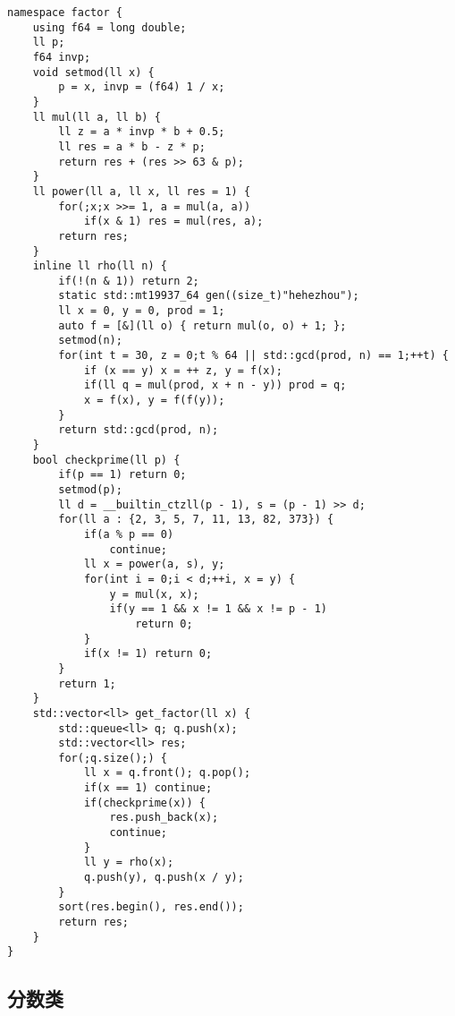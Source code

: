 \documentclass[a4paper,10pt]{article}
\begin{document}
\noindent\begin{lstlisting}
namespace factor {
    using f64 = long double;
    ll p;
    f64 invp;
    void setmod(ll x) {
        p = x, invp = (f64) 1 / x;
    }
    ll mul(ll a, ll b) {
        ll z = a * invp * b + 0.5;
        ll res = a * b - z * p;
        return res + (res >> 63 & p);
    }
    ll power(ll a, ll x, ll res = 1) {
        for(;x;x >>= 1, a = mul(a, a))
            if(x & 1) res = mul(res, a);
        return res;
    }
    inline ll rho(ll n) {
        if(!(n & 1)) return 2;
        static std::mt19937_64 gen((size_t)"hehezhou");
        ll x = 0, y = 0, prod = 1;
        auto f = [&](ll o) { return mul(o, o) + 1; };
        setmod(n);
        for(int t = 30, z = 0;t % 64 || std::gcd(prod, n) == 1;++t) {
            if (x == y) x = ++ z, y = f(x);
            if(ll q = mul(prod, x + n - y)) prod = q;
            x = f(x), y = f(f(y));
        }
        return std::gcd(prod, n);
    }
    bool checkprime(ll p) {
        if(p == 1) return 0;
        setmod(p);
        ll d = __builtin_ctzll(p - 1), s = (p - 1) >> d;
        for(ll a : {2, 3, 5, 7, 11, 13, 82, 373}) {
            if(a % p == 0)
                continue;
            ll x = power(a, s), y;
            for(int i = 0;i < d;++i, x = y) {
                y = mul(x, x);
                if(y == 1 && x != 1 && x != p - 1)
                    return 0;
            }
            if(x != 1) return 0;
        }
        return 1;
    }
    std::vector<ll> get_factor(ll x) {
        std::queue<ll> q; q.push(x);
        std::vector<ll> res;
        for(;q.size();) {
            ll x = q.front(); q.pop();
            if(x == 1) continue;
            if(checkprime(x)) {
                res.push_back(x);
                continue;
            }
            ll y = rho(x);
            q.push(y), q.push(x / y);
        }
        sort(res.begin(), res.end());
        return res;
    }
}\end{lstlisting}

\subsection{分数类}
\thispagestyle{fancy}
\end{document}

